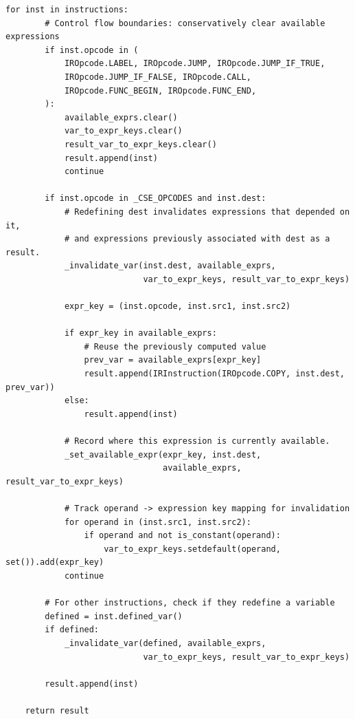 \begin{lstlisting}[style=snippet]
    for inst in instructions:
        # Control flow boundaries: conservatively clear available expressions
        if inst.opcode in (
            IROpcode.LABEL, IROpcode.JUMP, IROpcode.JUMP_IF_TRUE,
            IROpcode.JUMP_IF_FALSE, IROpcode.CALL,
            IROpcode.FUNC_BEGIN, IROpcode.FUNC_END,
        ):
            available_exprs.clear()
            var_to_expr_keys.clear()
            result_var_to_expr_keys.clear()
            result.append(inst)
            continue

        if inst.opcode in _CSE_OPCODES and inst.dest:
            # Redefining dest invalidates expressions that depended on it,
            # and expressions previously associated with dest as a result.
            _invalidate_var(inst.dest, available_exprs,
                            var_to_expr_keys, result_var_to_expr_keys)

            expr_key = (inst.opcode, inst.src1, inst.src2)

            if expr_key in available_exprs:
                # Reuse the previously computed value
                prev_var = available_exprs[expr_key]
                result.append(IRInstruction(IROpcode.COPY, inst.dest, prev_var))
            else:
                result.append(inst)

            # Record where this expression is currently available.
            _set_available_expr(expr_key, inst.dest,
                                available_exprs, result_var_to_expr_keys)

            # Track operand -> expression key mapping for invalidation
            for operand in (inst.src1, inst.src2):
                if operand and not is_constant(operand):
                    var_to_expr_keys.setdefault(operand, set()).add(expr_key)
            continue

        # For other instructions, check if they redefine a variable
        defined = inst.defined_var()
        if defined:
            _invalidate_var(defined, available_exprs,
                            var_to_expr_keys, result_var_to_expr_keys)

        result.append(inst)

    return result
\end{lstlisting}

